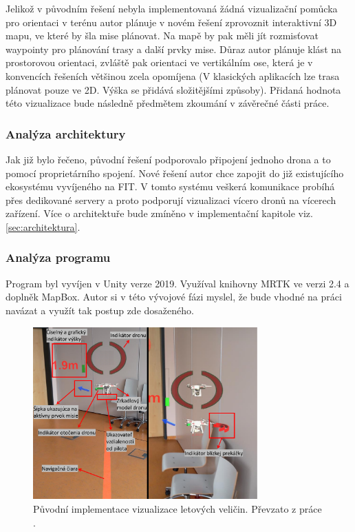 Jelikož v původním řešení nebyla implementovaná žádná vizualizační pomůcka pro orientaci v terénu autor plánuje v novém řešení zprovoznit interaktivní 3D mapu, ve které by šla mise plánovat. Na mapě by pak měli jít rozmisťovat waypointy pro plánování trasy a další prvky mise. Důraz autor plánuje klást na prostorovou orientaci, zvláště pak orientaci ve vertikálním ose, která je v konvencích řešeních většinou zcela opomíjena (V klasických aplikacích lze trasa plánovat pouze ve 2D. Výška se přidává složitějšími způsoby). Přidaná hodnota této vizualizace bude následně předmětem zkoumání v závěrečné části práce.
\subsubsection{Analýza architektury}
Jak již bylo řečeno, původní řešení podporovalo připojení jednoho drona a to pomocí proprietárního spojení. Nové řešení autor chce zapojit do již existujícího ekosystému vyvíjeného na FIT. V tomto systému veškerá komunikace probíhá přes dedikované servery a proto podporují vizualizaci vícero dronů na vícerech zařízení. Více o architektuře bude zmíněno v implementační kapitole viz. \ref{sec:architektura}.
\subsubsection{Analýza programu}
Program byl vyvíjen v Unity verze 2019. Využíval knihovny MRTK ve verzi 2.4 a doplněk MapBox. Autor si v této vývojové fázi myslel, že bude vhodné na práci navázat a využít tak postup zde dosaženého.

\begin{figure}[ht]
	\centering
	\includegraphics[width=0.77\textwidth]{obrazky-figures/navrh/prevUiDesign.pdf}
	\caption{Původní implementace vizualizace letových veličin. Převzato z práce \cite{KyjacMartin2022Vnpp}.}
	\label{pic:prevUiDesign}
\end{figure}


